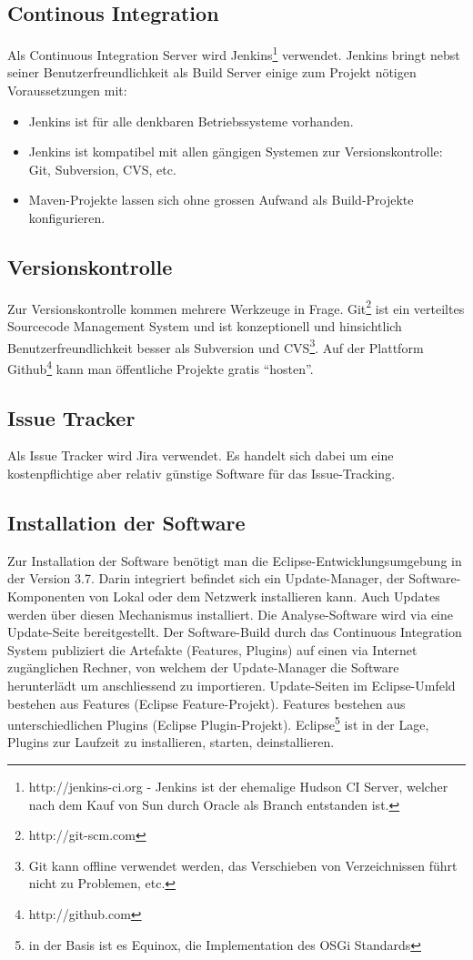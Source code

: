 \subsection{Continous Integration}
Als Continuous Integration Server wird Jenkins\footnote{http://jenkins-ci.org - Jenkins ist der ehemalige Hudson CI Server, welcher nach dem Kauf von Sun durch Oracle als Branch entstanden ist.} verwendet. Jenkins bringt nebst seiner Benutzerfreundlichkeit als Build Server einige zum Projekt nötigen Voraussetzungen mit:
\begin{itemize}
	\item Jenkins ist für alle denkbaren Betriebssysteme vorhanden.
	\item Jenkins ist kompatibel mit allen gängigen Systemen zur Versionskontrolle: Git, Subversion, CVS, etc.
	\item Maven-Projekte lassen sich ohne grossen Aufwand als Build-Projekte konfigurieren.
\end{itemize}

\subsection{Versionskontrolle}
Zur Versionskontrolle kommen mehrere Werkzeuge in Frage. Git\footnote{http://git-scm.com} ist ein verteiltes Sourcecode Management System und ist konzeptionell und hinsichtlich Benutzerfreundlichkeit besser als Subversion und CVS\footnote{Git kann offline verwendet werden, das Verschieben von Verzeichnissen führt nicht zu Problemen, etc.}. Auf der Plattform Github\footnote{http://github.com} kann man öffentliche Projekte gratis ``hosten''.

\subsection{Issue Tracker}
Als Issue Tracker wird Jira verwendet. Es handelt sich dabei um eine kostenpflichtige aber relativ günstige Software für das Issue-Tracking.

\subsection{Installation der Software}\label{installation}
Zur Installation der Software benötigt man die Eclipse-Entwicklungsumgebung in der Version 3.7. Darin integriert befindet sich ein Update-Manager, der Software-Komponenten von Lokal oder dem Netzwerk installieren kann. Auch Updates werden über diesen Mechanismus installiert. Die Analyse-Software wird via eine Update-Seite bereitgestellt. Der Software-Build durch das Continuous Integration System publiziert die Artefakte (Features, Plugins) auf einen via Internet zugänglichen Rechner, von welchem der Update-Manager die Software herunterlädt um anschliessend zu importieren. Update-Seiten im Eclipse-Umfeld bestehen aus Features (Eclipse Feature-Projekt). Features bestehen aus unterschiedlichen Plugins (Eclipse Plugin-Projekt). Eclipse\footnote{in der Basis ist es Equinox, die Implementation des OSGi Standards} ist in der Lage, Plugins zur Laufzeit zu installieren, starten, deinstallieren.

